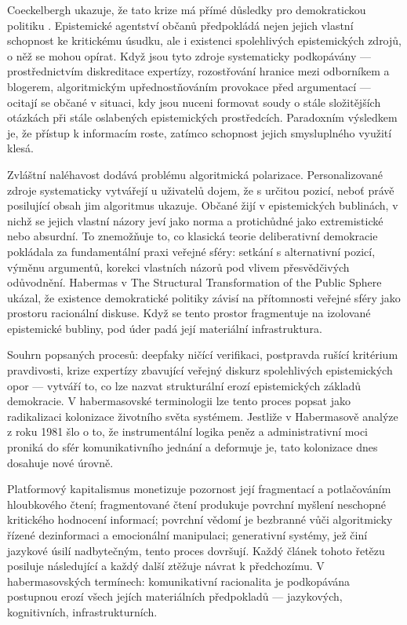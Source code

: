Coeckelbergh ukazuje, že tato krize má přímé důsledky pro demokratickou politiku \parencite{Coeckelbergh23}. Epistemické agentství občanů předpokládá nejen jejich vlastní schopnost ke kritickému úsudku, ale i existenci spolehlivých epistemických zdrojů, o něž se mohou opírat. Když jsou tyto zdroje systematicky podkopávány — prostřednictvím diskreditace expertízy, rozostřování hranice mezi odborníkem a blogerem, algoritmickým upřednostňováním provokace před argumentací — ocitají se občané v situaci, kdy jsou nuceni formovat soudy o stále složitějších otázkách při stále oslabených epistemických prostředcích. Paradoxním výsledkem je, že přístup k informacím roste, zatímco schopnost jejich smysluplného využití klesá.

Zvláštní naléhavost dodává problému algoritmická polarizace.
Personalizované zdroje systematicky vytvářejí u uživatelů dojem, že  s určitou pozicí, neboť právě posilující obsah jim algoritmus ukazuje. Občané žijí v epistemických bublinách, v nichž se jejich vlastní názory jeví jako norma a protichůdné jako extremistické nebo absurdní. To znemožňuje to, co klasická teorie deliberativní demokracie pokládala za fundamentální praxi veřejné sféry: setkání s alternativní pozicí, výměnu argumentů, korekci vlastních názorů pod vlivem přesvědčivých odůvodnění. Habermas v The Structural Transformation of the Public Sphere \parencite{Habermas89} ukázal, že existence demokratické politiky závisí na přítomnosti veřejné sféry jako prostoru racionální diskuse. Když se tento prostor fragmentuje na izolované epistemické bubliny, pod úder padá její materiální infrastruktura.

Souhrn popsaných procesů: deepfaky ničící verifikaci, postpravda rušící kritérium pravdivosti, krize expertízy zbavující veřejný diskurz spolehlivých epistemických opor — vytváří to, co lze nazvat strukturální erozí epistemických základů demokracie. V habermasovské terminologii lze tento proces popsat jako radikalizaci kolonizace životního světa systémem. Jestliže v Habermasově analýze z roku 1981 šlo o to, že instrumentální logika peněz a administrativní moci proniká do sfér komunikativního jednání a deformuje je, tato kolonizace dnes dosahuje nové úrovně.

Platformový kapitalismus monetizuje pozornost její fragmentací a potlačováním hloubkového čtení; fragmentované čtení produkuje povrchní myšlení neschopné kritického hodnocení informací; povrchní vědomí je bezbranné vůči algoritmicky řízené dezinformaci a emocionální manipulaci; generativní systémy, jež činí jazykové úsilí nadbytečným, tento proces dovršují. Každý článek tohoto řetězu posiluje následující a každý další ztěžuje návrat k předchozímu. V habermasovských termínech: komunikativní racionalita je podkopávána postupnou erozí všech jejích materiálních předpokladů — jazykových, kognitivních, infrastrukturních.

